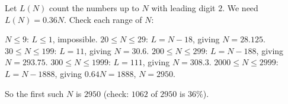 Let $L(N)$ count the numbers up to $N$ with leading digit $2$. We need $L(N)=0.36N$. Check each range of $N$:

$N\le9$: $L\le1$, impossible. $20\le N\le29$: $L=N-18$, giving $N=28.125$. $30\le N\le199$: $L=11$, giving $N=30.6$. $200\le N\le299$: $L=N-188$, giving $N=293.75$. $300\le N\le1999$: $L=111$, giving $N=308.3$. $2000\le N\le2999$: $L=N-1888$, giving $0.64N=1888$, $N=2950$.

So the first such $N$ is $\boxed{2950}$ (check: $1062$ of $2950$ is $36\%$).
